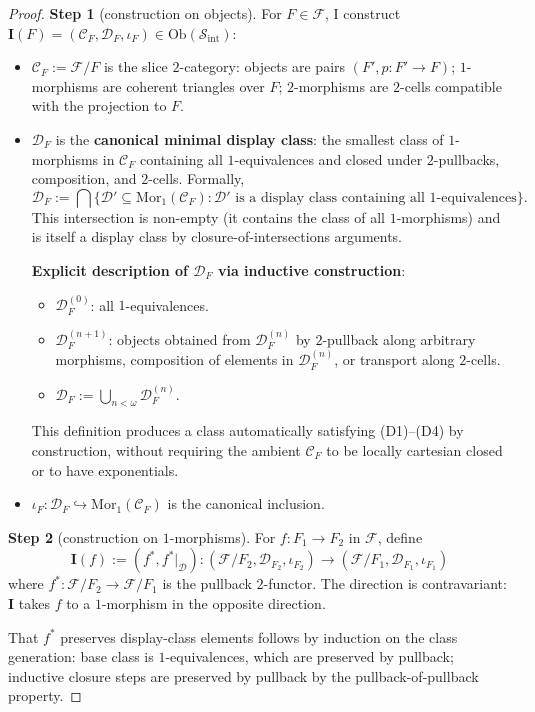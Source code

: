 \documentclass[11pt]{article}
\theoremstyle{plain}
\theoremstyle{definition}
\newcommand{\cS}{\mathcal{S}}
\newcommand{\cF}{\mathcal{F}}
\newcommand{\cC}{\mathcal{C}}
\newcommand{\cD}{\mathcal{D}}
\newcommand{\Sint}{\cS_{\mathrm{int}}}
\newcommand{\Ob}{\mathrm{Ob}}
\newcommand{\Mor}{\mathrm{Mor}}
\newcommand{\II}{\mathbf{I}}
\begin{document}
\begin{proof}

\textbf{Step 1} (construction on objects). For $F \in \cF$, I construct $\II(F) = (\cC_F, \cD_F, \iota_F) \in \Ob(\Sint)$:
\begin{itemize}
\item $\cC_F := \cF / F$ is the slice $2$-category: objects are pairs $(F', p : F' \to F)$; $1$-morphisms are coherent triangles over $F$; $2$-morphisms are $2$-cells compatible with the projection to $F$.
\item $\cD_F$ is the \textbf{canonical minimal display class}: the smallest class of $1$-morphisms in $\cC_F$ containing all $1$-equivalences and closed under $2$-pullbacks, composition, and $2$-cells. Formally,
\[ \cD_F := \bigcap \{\cD' \subseteq \Mor_1(\cC_F) : \cD' \text{ is a display class containing all } 1\text{-equivalences}\}. \]
This intersection is non-empty (it contains the class of all $1$-morphisms) and is itself a display class by closure-of-intersections arguments.

\textbf{Explicit description of $\cD_F$ via inductive construction}:
\begin{itemize}
\item $\cD_F^{(0)}$: all $1$-equivalences.
\item $\cD_F^{(n+1)}$: objects obtained from $\cD_F^{(n)}$ by $2$-pullback along arbitrary morphisms, composition of elements in $\cD_F^{(n)}$, or transport along $2$-cells.
\item $\cD_F := \bigcup_{n < \omega} \cD_F^{(n)}$.
\end{itemize}
This definition produces a class automatically satisfying (D1)--(D4) by construction, without requiring the ambient $\cC_F$ to be locally cartesian closed or to have exponentials.

\item $\iota_F : \cD_F \hookrightarrow \Mor_1(\cC_F)$ is the canonical inclusion.
\end{itemize}

\textbf{Step 2} (construction on $1$-morphisms). For $f : F_1 \to F_2$ in $\cF$, define
\[ \II(f) := (f^*, f^*|_\cD) : (\cF / F_2, \cD_{F_2}, \iota_{F_2}) \to (\cF / F_1, \cD_{F_1}, \iota_{F_1}) \]
where $f^* : \cF / F_2 \to \cF / F_1$ is the pullback $2$-functor. The direction is contravariant: $\II$ takes $f$ to a $1$-morphism in the opposite direction.

That $f^*$ preserves display-class elements follows by induction on the class generation: base class is $1$-equivalences, which are preserved by pullback; inductive closure steps are preserved by pullback by the pullback-of-pullback property.


\end{proof}
\end{document}
